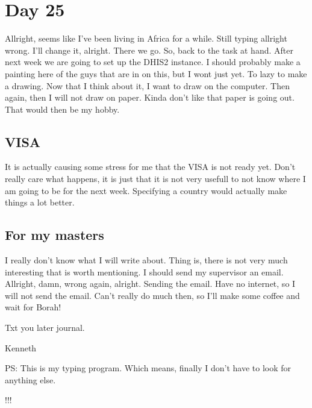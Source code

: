 \section{Day 25}
Allright, seems like I've been living in Africa for a while.
Still typing allright wrong. I'll change it, alright. There we go.
So, back to the task at hand. After next week we are going to set up the DHIS2 instance.
I should probably make a painting here of the guys that are in on this, but I wont just yet.
To lazy to make a drawing. Now that I think about it, I want to draw on the computer.
Then again, then I will not draw on paper.
Kinda don't like that paper is going out. 
That would then be my hobby.
\subsection{VISA}
It is actually causing some stress for me that the VISA is not ready yet.
Don't really care what happens, it is just that it is not very usefull to not know where I am going to be for the next week. Specifying a country would actually make things a lot better.
\subsection{For my masters}
I really don't know what I will write about.
Thing is, there is not very much interesting that is worth mentioning.
I should send my supervisor an email.
Allright, damn, wrong again, alright. Sending the email.
Have no internet, so I will not send the email.
Can't really do much then, so I'll make some coffee and wait for Borah! 

Txt you later journal.

Kenneth

PS: This is my typing program. Which means, finally I don't have to look for anything else.

!!!